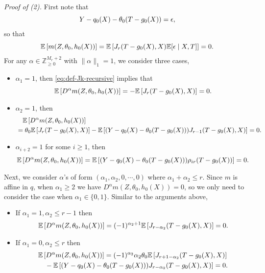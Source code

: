 \documentclass{article}
\def\eps{{\epsilon}}
\newcommand{\E}{\mathbb{E}}
\begin{document}
\textit{Proof of (2).} First note that
\begin{equation}
    \notag
    Y - q_0(X) - \theta_0(T-g_0(X)) = \eps,
\end{equation}
so that
\begin{equation}
    \notag
    \E\left[m(Z,\theta_0,h_0(X))\right] = \E\left[ J_r(T-g_0(X),X) \E[\eps\mid X,T] \right] = 0.
\end{equation}
For any $\alpha\in\mathbb{Z}_{\geq 0}^{M_r+2}$ with $\|\alpha\|_1=1$, we consider three cases,
\begin{itemize}
    \item $\alpha_1=1$, then \eqref{eq:def-Jk-recursive} implies that
    \begin{equation}
        \notag
        \E\left[D^{\alpha}m(Z,\theta_0,h_0(X))\right] = - \E\left[J_r(T-g_0(X),X)\right] = 0.
    \end{equation}
    \item $\alpha_2=1$, then
    \begin{equation}
        \notag
        \begin{aligned}
            &\quad \E\left[D^{\alpha}m(Z,\theta_0,h_0(X))\right] \\ &= \theta_0 \E\left[J_r(T-g_0(X),X)\right] - \E\left[ (Y-q_0(X)-\theta_0(T-g_0(X)))J_{r-1}(T-g_0(X),X) \right] = 0.
        \end{aligned}
    \end{equation}
    \item $\alpha_{i+2}=1$ for some $i\geq 1$, then
    \begin{equation}
        \notag
        \E\left[D^{\alpha}m(Z,\theta_0,h_0(X))\right] = \E\left[ (Y-q_0(X)-\theta_0(T-g_0(X)))\rho_{ir}(T-g_0(X)) \right] = 0.
    \end{equation}
\end{itemize}
Next, we consider $\alpha$'s of form $(\alpha_1,\alpha_2,0,\cdots,0)$ where $\alpha_1+\alpha_2\leq r$. Since $m$ is affine in $q$, when $\alpha_1 \geq 2$ we have $D^{\alpha}m(Z,\theta_0,h_0(X)) = 0$, so we only need to consider the case when $\alpha_1\in\{0,1\}$. Similar to the arguments above,
\begin{itemize}
    \item If $\alpha_1=1,\alpha_2\leq r-1$ then
    \begin{equation}
        \notag
        \E\left[D^{\alpha}m(Z,\theta_0,h_0(X))\right] = (-1)^{\alpha_2+1} \E\left[J_{r-\alpha_2}(T-g_0(X),X)\right] = 0.
    \end{equation}
    \item If $\alpha_1 = 0, \alpha_2 \leq r$ then
    \begin{equation}
        \notag
        \begin{aligned}
            & \E\left[D^{\alpha}m(Z,\theta_0,h_0(X))\right] = (-1)^{\alpha_2}\alpha_2\theta_0 \E\left[J_{r+1-\alpha_2}(T-g_0(X),X)\right] \\
            &\quad - \E\left[ (Y-q_0(X)-\theta_0(T-g_0(X)))J_{r-\alpha_2}(T-g_0(X),X) \right] = 0.
        \end{aligned}
    \end{equation}
\end{itemize}
\end{document}
